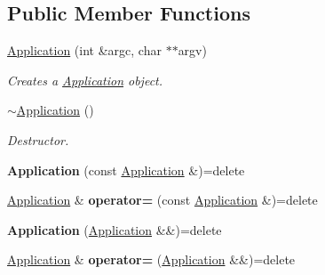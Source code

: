 \subsection*{Public Member Functions}
\begin{DoxyCompactItemize}
\item 
\hyperlink{class_mdt_1_1_application_a5038a26f5618eba0c6f8c51e7eca76dd}{Application} (int \&argc, char $\ast$$\ast$argv)
\begin{DoxyCompactList}\small\item\em Creates a \hyperlink{class_mdt_1_1_application}{Application} object. \end{DoxyCompactList}\item 
\hyperlink{class_mdt_1_1_application_a24456c7eb1e79fa5c73459f1c64f7e84}{$\sim$\+Application} ()
\begin{DoxyCompactList}\small\item\em Destructor. \end{DoxyCompactList}\item 
{\bfseries Application} (const \hyperlink{class_mdt_1_1_application}{Application} \&)=delete\hypertarget{class_mdt_1_1_application_a5c17bc0f9eeda52a18f13e797cdc49e7}{}\label{class_mdt_1_1_application_a5c17bc0f9eeda52a18f13e797cdc49e7}

\item 
\hyperlink{class_mdt_1_1_application}{Application} \& {\bfseries operator=} (const \hyperlink{class_mdt_1_1_application}{Application} \&)=delete\hypertarget{class_mdt_1_1_application_a3b0046f08873c3f74357ed92e39433da}{}\label{class_mdt_1_1_application_a3b0046f08873c3f74357ed92e39433da}

\item 
{\bfseries Application} (\hyperlink{class_mdt_1_1_application}{Application} \&\&)=delete\hypertarget{class_mdt_1_1_application_a70f78a5e7bbf97c58530b59cc5fa041e}{}\label{class_mdt_1_1_application_a70f78a5e7bbf97c58530b59cc5fa041e}

\item 
\hyperlink{class_mdt_1_1_application}{Application} \& {\bfseries operator=} (\hyperlink{class_mdt_1_1_application}{Application} \&\&)=delete\hypertarget{class_mdt_1_1_application_a61d3d984d0caa80a0bbbaadab4fd5c9c}{}\label{class_mdt_1_1_application_a61d3d984d0caa80a0bbbaadab4fd5c9c}


\end{DoxyCompactItemize}
